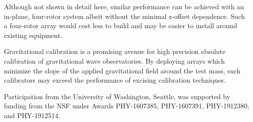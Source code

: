 \documentclass[superscriptaddress, twocolumn, prd]{revtex4-1}
\begin{document}
Although not shown in detail here, similar performance can be achieved with an in-plane, four-rotor system albeit without the minimal z-offset dependence. Such a four-rotor array would cost less to build and may be easier to install around existing equipment.

Gravitational calibration is a promising avenue for high precision absolute calibration of gravitational wave observatories. By deploying arrays which minimize the slope of the applied gravitational field around the test mass, such calibrators may exceed the performance of excising calibration techniques.

\begin{acknowledgements}

Participation from the University of Washington, Seattle, was supported by funding from the NSF under Awards PHY-1607385, PHY-1607391, PHY-1912380, and PHY-1912514.


\end{acknowledgements}


 

\end{document}
